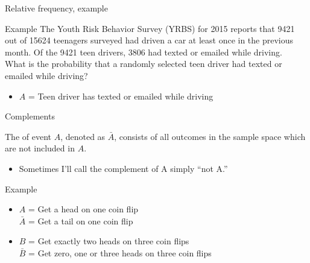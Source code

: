 \documentclass[xcolor=table, aspectratio=169, bigger, handout]{beamer}
\begin{document}
\begin{frame}{Relative frequency, example}

\begin{exampleblock}{Example}
The Youth Risk Behavior Survey (YRBS) for 2015 reports that 9421 out of 15624 teenagers surveyed had driven a car at least once in the previous month. Of the 9421 teen drivers, 3806 had texted or emailed while driving. \\
\medskip
What is the probability that a randomly selected teen driver had texted or emailed while driving? 

\pause
\begin{itemize}
\item $A$ = Teen driver has texted or emailed while driving\\
\smallskip
{}
\end{itemize}

\end{exampleblock}

\end{frame}


\begin{frame}{Complements}
\begin{block}{}
The  of event $A$, denoted as $\bar A$, consists of all outcomes in the sample space which are not included in $A$.
\begin{itemize}
\item Sometimes I'll call the complement of A simply ``not A.''
\end{itemize}
\end{block}

\pause
\begin{exampleblock}{Example}
\begin{itemize}
\item $A$ = Get a head on one coin flip\\
\pause
$\bar A$ = Get a tail on one coin flip

\pause
\item $B$ = Get exactly two heads on three coin flips\\
\pause
$\bar B$ = Get zero, one or three heads on three coin flips
\end{itemize}
\end{exampleblock}
\end{frame}
 
\end{document}

